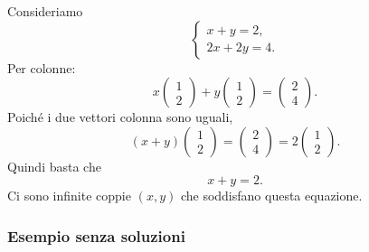 \documentclass[a4paper]{article}
\begin{document}
Consideriamo
\[
    \begin{cases}
        x+y=2,\\
        2x+2y=4.
    \end{cases}
\]
Per colonne:
\[
    x
    \begin{pmatrix}
        1\\
        2
    \end{pmatrix}
    +
    y
    \begin{pmatrix}
        1\\
        2
    \end{pmatrix}
    =
    \begin{pmatrix}
        2\\
        4
    \end{pmatrix}.
\]
Poiché i due vettori colonna sono uguali,
\[
    (x+y)
    \begin{pmatrix}
        1\\
        2
    \end{pmatrix}
    =
    \begin{pmatrix}
        2\\
        4
    \end{pmatrix}
    =
    2
    \begin{pmatrix}
        1\\
        2
    \end{pmatrix}.
\]
Quindi basta che
\[
    x+y=2.
\]
Ci sono infinite coppie \((x,y)\) che soddisfano questa equazione.

\subsubsection{Esempio senza soluzioni}
\end{document}
